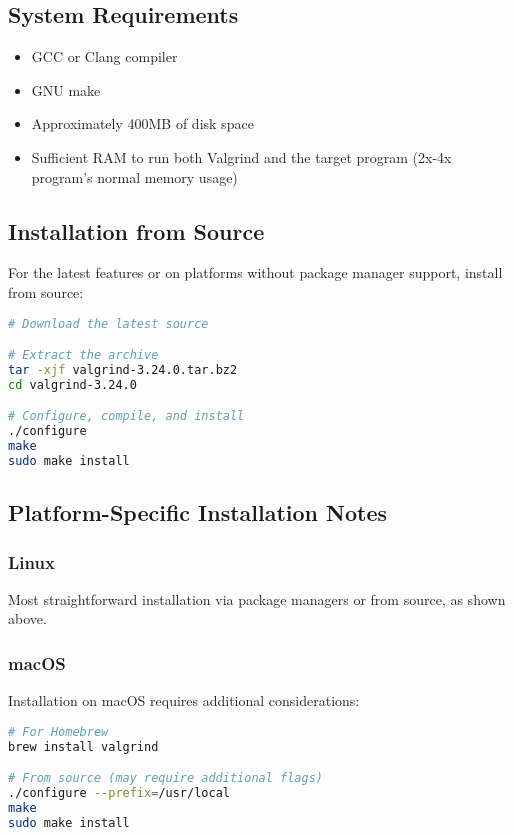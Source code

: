 \documentclass[11pt,a4paper]{article}
\begin{document}
\subsection{System Requirements}
\begin{itemize}
    \item GCC or Clang compiler
    \item GNU make
    \item Approximately 400MB of disk space
    \item Sufficient RAM to run both Valgrind and the target program (2x-4x program's normal memory usage)
\end{itemize}

\subsection{Installation from Source}
For the latest features or on platforms without package manager support, install from source:

\begin{lstlisting}[caption=Installation from source code, language=bash]
# Download the latest source

# Extract the archive
tar -xjf valgrind-3.24.0.tar.bz2
cd valgrind-3.24.0

# Configure, compile, and install
./configure
make
sudo make install
\end{lstlisting}

\subsection{Platform-Specific Installation Notes}

\subsubsection{Linux}
Most straightforward installation via package managers or from source, as shown above.

\subsubsection{macOS}
Installation on macOS requires additional considerations:

\begin{lstlisting}[caption=macOS installation notes, language=bash]
# For Homebrew
brew install valgrind

# From source (may require additional flags)
./configure --prefix=/usr/local
make
sudo make install
\end{lstlisting}
\end{document}
